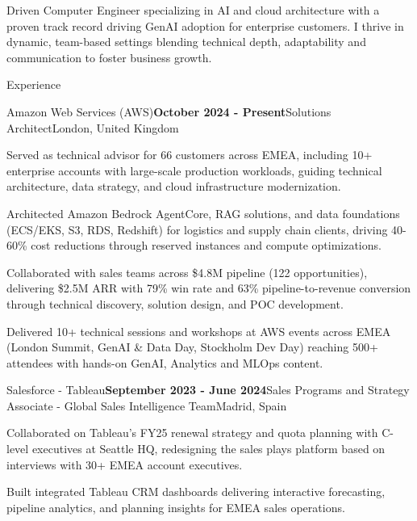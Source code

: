 \documentclass[
	11pt, %
]{resume} %
\begin{document}
\begin{center}
    Driven Computer Engineer specializing in AI and cloud architecture with a proven track record driving GenAI adoption for enterprise customers. I thrive in dynamic, team-based settings blending technical depth, adaptability and communication to foster business growth.
\end{center}


\begin{rSection}{Experience}

    \begin{rSubsection}{Amazon Web Services (AWS)}{\textbf{October 2024 - Present}}{Solutions Architect}{London, United Kingdom}  
    \item Served as technical advisor for 66 customers across EMEA, including 10+ enterprise accounts with large-scale production workloads, guiding technical architecture, data strategy, and cloud infrastructure modernization.
    \item Architected Amazon Bedrock AgentCore, RAG solutions, and data foundations (ECS/EKS, S3, RDS, Redshift) for logistics and supply chain clients, driving 40-60\% cost reductions through reserved instances and compute optimizations.
    \item Collaborated with sales teams across \$4.8M pipeline (122 opportunities), delivering \$2.5M ARR with 79\% win rate and 63\% pipeline-to-revenue conversion through technical discovery, solution design, and POC development.
    \item Delivered 10+ technical sessions and workshops at AWS events across EMEA (London Summit, GenAI \& Data Day, Stockholm Dev Day) reaching 500+ attendees with hands-on GenAI, Analytics and MLOps content.
    \end{rSubsection}
    
	\begin{rSubsection}{Salesforce - Tableau}{\textbf{September 2023 - June 2024}}{Sales Programs and Strategy Associate - Global Sales Intelligence Team}{Madrid, Spain}     
    \item Collaborated on Tableau's FY25 renewal strategy and quota planning with C-level executives at Seattle HQ, redesigning the sales plays platform based on interviews with 30+ EMEA account executives.
    \item Built integrated Tableau CRM dashboards delivering interactive forecasting, pipeline analytics, and planning insights for EMEA sales operations.
	\end{rSubsection}    


\end{rSection}
\end{document}
